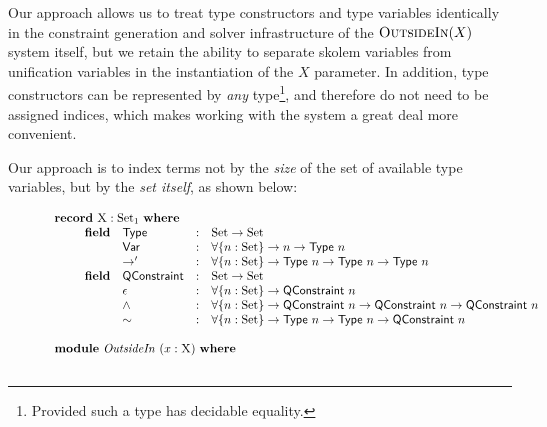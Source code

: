 \documentclass[a4paper]{jfp}
\newcommand{\outsidein}{\textsc{OutsideIn}(X)}
\begin{document}
Our approach allows us to treat type constructors and type variables identically in the constraint generation and solver infrastructure of the
$\outsidein$ system itself, but we retain the ability to separate skolem variables from unification variables in the instantiation of the $X$
parameter. In addition, type constructors can be represented by \emph{any} type\footnote{Provided such a type has decidable equality.}, and therefore
do not need to be assigned indices, which makes working with the system a great deal more convenient. 

Our approach is to index terms not by the \emph{size} of the set of available type variables, but by the \emph{set itself}, as shown below:
\nopagebreak
\begin{figure}[H]
\begin{displaymath}
   \begin{array}{l}
   \textbf{record}\ \textsc{X} : \text{Set}_1\ \textbf{where} \\ \qquad
   \begin{array}{llcl} 
   \textbf{field} & \textsf{Type} & : & \text{Set} \rightarrow \text{Set} \\ 
                  & \textsf{Var} & : & \forall \{ n : \text{Set} \} \rightarrow n \rightarrow \textsf{Type}\ n \\
                  & \rightarrow' & : & \forall \{ n : \text{Set} \} \rightarrow \textsf{Type}\ n \rightarrow \textsf{Type}\ n 
                                                                    \rightarrow \textsf{Type} \ n \\
   \textbf{field} & \textsf{QConstraint} & : & \text{Set} \rightarrow \text{Set} \\
                  & \epsilon & : & \forall \{ n : \text{Set} \} \rightarrow \textsf{QConstraint}\ n \\
                  & \land & : & \forall \{ n : \text{Set} \} \rightarrow \textsf{QConstraint}\ n \rightarrow \textsf{QConstraint}\ n 
                                                             \rightarrow \textsf{QConstraint}\ n \\
                  & \sim & : &\forall \{ n : \text{Set} \} \rightarrow  \textsf{Type}\ n \rightarrow \textsf{Type}\ n 
                                                           \rightarrow  \textsf{QConstraint}\ n\\
   \end{array}\\\\
   \textbf{module}\ \mathit{OutsideIn}\ ( x : \textsc{X})\ \textbf{where} \\ \qquad 

\end{array}
\end{displaymath}
\end{figure}
\end{document}
